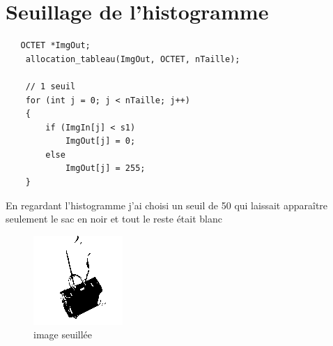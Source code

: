 \documentclass{article}
\begin{document}
\newpage
\section{Seuillage de l'histogramme}
\begin{lstlisting}
   OCTET *ImgOut;
    allocation_tableau(ImgOut, OCTET, nTaille);

    // 1 seuil
    for (int j = 0; j < nTaille; j++)
    {
        if (ImgIn[j] < s1)
            ImgOut[j] = 0;
        else
            ImgOut[j] = 255;
    }
\end{lstlisting}
En regardant l'histogramme j'ai choisi un seuil de 50 qui laissait apparaître seulement le sac en noir et tout le reste était blanc
\begin{figure}[h!]
\centerline{\includegraphics[scale=1.2]{./rendus/sacSeuil.png}}
\caption{image seuillée }
\end{figure}

\newpage
\end{document}

